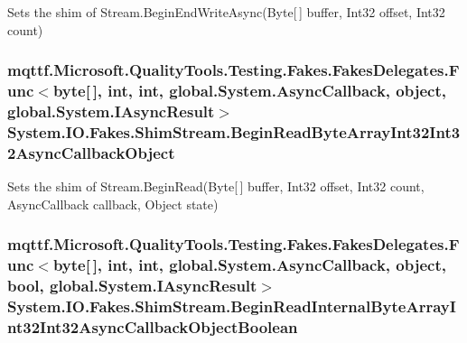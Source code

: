 Sets the shim of Stream.\-Begin\-End\-Write\-Async(\-Byte\mbox{[}$\,$\mbox{]} buffer, Int32 offset, Int32 count)

\hypertarget{class_system_1_1_i_o_1_1_fakes_1_1_shim_stream_a46d20bad73d84e2c1582171a371b3686}{
\subsubsection[{Begin\-Read\-Byte\-Array\-Int32\-Int32\-Async\-Callback\-Object}]{\setlength{\rightskip}{0pt plus 5cm}mqttf.\-Microsoft.\-Quality\-Tools.\-Testing.\-Fakes.\-Fakes\-Delegates.\-Func$<$byte\mbox{[}$\,$\mbox{]}, int, int, global.\-System.\-Async\-Callback, object, global.\-System.\-I\-Async\-Result$>$ System.\-I\-O.\-Fakes.\-Shim\-Stream.\-Begin\-Read\-Byte\-Array\-Int32\-Int32\-Async\-Callback\-Object\hspace{0.3cm}{\ttfamily [set]}}}\label{class_system_1_1_i_o_1_1_fakes_1_1_shim_stream_a46d20bad73d84e2c1582171a371b3686}


Sets the shim of Stream.\-Begin\-Read(\-Byte\mbox{[}$\,$\mbox{]} buffer, Int32 offset, Int32 count, Async\-Callback callback, Object state)

\hypertarget{class_system_1_1_i_o_1_1_fakes_1_1_shim_stream_a0f13d5f4936dc7cf365d36056ac9e73c}{
\subsubsection[{Begin\-Read\-Internal\-Byte\-Array\-Int32\-Int32\-Async\-Callback\-Object\-Boolean}]{\setlength{\rightskip}{0pt plus 5cm}mqttf.\-Microsoft.\-Quality\-Tools.\-Testing.\-Fakes.\-Fakes\-Delegates.\-Func$<$byte\mbox{[}$\,$\mbox{]}, int, int, global.\-System.\-Async\-Callback, object, bool, global.\-System.\-I\-Async\-Result$>$ System.\-I\-O.\-Fakes.\-Shim\-Stream.\-Begin\-Read\-Internal\-Byte\-Array\-Int32\-Int32\-Async\-Callback\-Object\-Boolean\hspace{0.3cm}{\ttfamily [set]}}}\label{class_system_1_1_i_o_1_1_fakes_1_1_shim_stream_a0f13d5f4936dc7cf365d36056ac9e73c}


